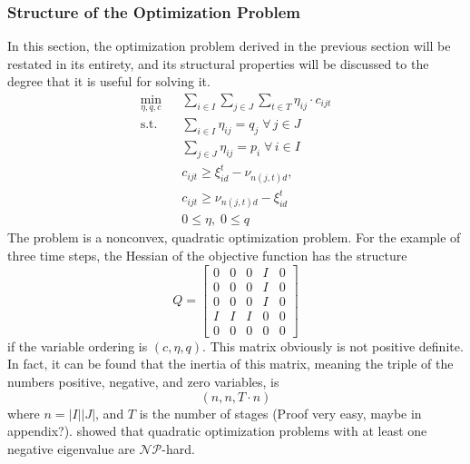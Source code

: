 \documentclass[a4paper, 12pt] {article}
\begin{document}
\subsubsection{Structure of the Optimization Problem}
In this section, the optimization problem derived in the previous section will be restated in its entirety, and its structural properties will be discussed to the degree that it is useful for solving it.
\begin{eqnarray}
  \label{eq:full-nlp-restated-objecive}
  \min_{\eta, q, c}&&  \sum_{i\in I}\sum_{j\in J}\sum_{t\in T} \eta_{ij}\cdot c_{ijt}\\\label{eq:full-nlp-restated-q}
  \mathrm{s.t.}&&\sum_{i\in I}\eta_{ij} = q_j \;\forall\, j\in J\\
  \label{eq:full-nlp-restated-p}
  &&\sum_{j\in J}\eta_{ij} = p_i \;\forall\, i\in I\\
  \label{eq:full-nlp-restated-ineq1}
  &&c_{ijt} \geq \xi_{id}^t - \nu_{n(j,t)d},\\
  \label{eq:full-nlp-restated-ineq2}
  &&c_{ijt} \geq \nu_{n(j,t)d} - \xi_{id}^t\\ 
  &&0 \leq \eta,\; 0\leq q
\end{eqnarray}
The problem is a nonconvex, quadratic optimization problem. For the example of three time steps, the Hessian of the objective function has the structure
\begin{equation}
  \label{eq:structure-of-quadratic-hessian}
  Q = \left[\begin{array}{ccccc}
      0&0&0&I&0\\0&0&0&I&0\\0&0&0&I&0\\I&I&I&0&0\\0&0&0&0&0
    \end{array}\right]
\end{equation}
if the variable ordering is $(c,\eta, q)$. This matrix obviously is not positive definite. In fact, it can be found that the inertia of this matrix, meaning the triple of the numbers positive, negative, and zero variables, is
\begin{equation}
  \label{eq:inertia-of-hessian}
  \left(n, n, T\cdot n\right)
\end{equation}
where $n=|I||J|$, and $T$ is the number of stages (Proof very easy, maybe in appendix?). \cite{Pardalos1991} showed that quadratic optimization problems with at least one negative eigenvalue are $\mathcal{NP}$-hard.
\end{document}
